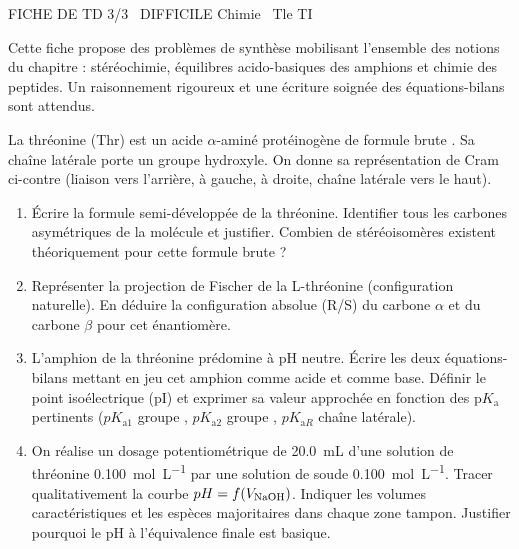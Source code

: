 \documentclass[11pt]{article}
\begin{document}
\begin{tcolorbox}[enhanced,colback=popink,colframe=popink,arc=10pt,boxrule=0pt,left=12pt,right=12pt,top=9pt,bottom=9pt]
{\color{white}\popxbold\small FICHE DE TD 3/3 \textbullet\ DIFFICILE \hfill Chimie \textbullet\ Tle TI\par}
\end{tcolorbox}
\vspace{4pt}
\noindent Cette fiche propose des problèmes de synthèse mobilisant l'ensemble des notions du chapitre : stéréochimie, équilibres acido-basiques des amphions et chimie des peptides. Un raisonnement rigoureux et une écriture soignée des équations-bilans sont attendus.

\begin{exercice}
La thréonine (Thr) est un acide $\alpha$-aminé protéinogène de formule brute . Sa chaîne latérale porte un groupe hydroxyle. On donne sa représentation de Cram ci-contre (liaison  vers l'arrière,  à gauche,  à droite, chaîne latérale vers le haut).
\begin{enumerate}
    \item Écrire la formule semi-développée de la thréonine. Identifier tous les carbones asymétriques de la molécule et justifier. Combien de stéréoisomères existent théoriquement pour cette formule brute ?
    \item Représenter la projection de Fischer de la L-thréonine (configuration naturelle). En déduire la configuration absolue (R/S) du carbone $\alpha$ et du carbone $\beta$ pour cet énantiomère.
    \item L'amphion de la thréonine prédomine à pH neutre. Écrire les deux équations-bilans mettant en jeu cet amphion comme acide et comme base. Définir le point isoélectrique (pI) et exprimer sa valeur approchée en fonction des p$K_\text{a}$ pertinents ($pK_{\text{a}1}$ groupe , $pK_{\text{a}2}$ groupe , $pK_{\text{a}R}$ chaîne latérale).
    \item On réalise un dosage potentiométrique de \SI{20,0}{\milli\liter} d'une solution de thréonine \SI{0,100}{\mole\per\liter} par une solution de soude \SI{0,100}{\mole\per\liter}. Tracer qualitativement la courbe $pH = f(V_{\ce{NaOH}})$. Indiquer les volumes caractéristiques et les espèces majoritaires dans chaque zone tampon. Justifier pourquoi le pH à l'équivalence finale est basique.
\end{enumerate}
\end{exercice}
\end{document}
